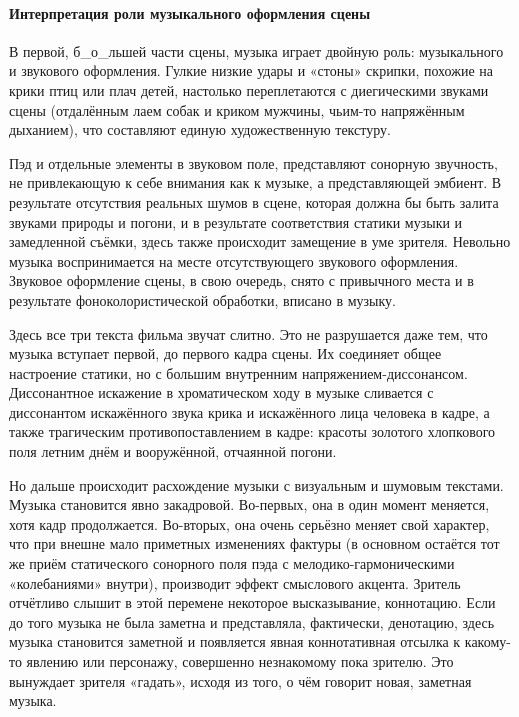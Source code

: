 \paragraph{Интерпретация роли музыкального оформления сцены}\label{ux438ux43dux442ux435ux440ux43fux440ux435ux442ux430ux446ux438ux44f-ux440ux43eux43bux438-ux43cux443ux437ux44bux43aux430ux43bux44cux43dux43eux433ux43e-ux43eux444ux43eux440ux43cux43bux435ux43dux438ux44f-ux441ux446ux435ux43dux44b}

В первой, б\_о\_льшей части сцены, музыка играет двойную роль: музыкального и звукового оформления.
Гулкие низкие удары и «стоны» скрипки, похожие на крики птиц или плач детей, настолько переплетаются с диегическими звуками сцены (отдалённым лаем собак и криком мужчины, чьим-то напряжённым дыханием), что составляют единую художественную текстуру.

Пэд и отдельные элементы в звуковом поле, представляют сонорную звучность, не привлекающую к себе внимания как к музыке, а представляющей эмбиент.
В результате отсутствия реальных шумов в сцене, которая должна бы быть залита звуками природы и погони, и в результате соответствия статики музыки и замедленной съёмки, здесь также происходит замещение в уме зрителя.
Невольно музыка воспринимается на месте отсутствующего звукового оформления.
Звуковое оформление сцены, в свою очередь, снято с привычного места и в результате фоноколористической обработки, вписано в музыку.

Здесь все три текста фильма звучат слитно.
Это не разрушается даже тем, что музыка вступает первой, до первого кадра сцены.
Их соединяет общее настроение статики, но с большим внутренним напряжением-диссонансом.
Диссонантное искажение в хроматическом ходу в музыке сливается с диссонантом искажённого звука крика и искажённого лица человека в кадре, а также трагическим противопоставлением в кадре: красоты золотого хлопкового поля летним днём и вооружённой, отчаянной погони.

Но дальше происходит расхождение музыки с визуальным и шумовым текстами.
Музыка становится явно закадровой.
Во-первых, она в один момент меняется, хотя кадр продолжается.
Во-вторых, она очень серьёзно меняет свой характер, что при внешне мало приметных изменениях фактуры (в основном остаётся тот же приём статического сонорного поля пэда с мелодико-гармоническими «колебаниями» внутри), производит эффект смыслового акцента.
Зритель отчётливо слышит в этой перемене некоторое высказывание, коннотацию.
Если до того музыка не была заметна и представляла, фактически, денотацию, здесь музыка становится заметной и появляется явная коннотативная отсылка к какому-то явлению или персонажу, совершенно незнакомому пока зрителю.
Это вынуждает зрителя «гадать», исходя из того, о чём говорит новая, заметная музыка.

